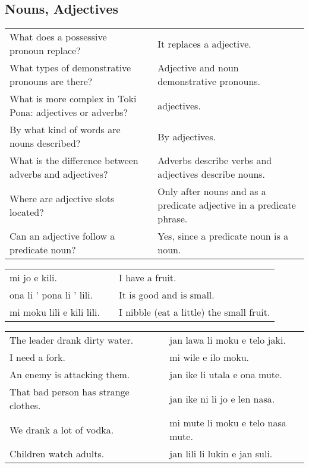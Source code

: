 \newpage
%
\subsection*{Nouns, Adjectives} 
\label{'adjectives'}
%
\begin{supertabular}{p{5,5cm}|ll}
What does a possessive pronoun replace? && It replaces a adjective. \\ %
What types of demonstrative pronouns are there? && Adjective and noun demonstrative pronouns.  \\ %
What is more complex in Toki Pona: adjectives or adverbs? && adjectives.  \\ %
By what kind of words are nouns described? && By adjectives.  \\ %
What is the difference between adverbs and adjectives? && Adverbs describe verbs and adjectives describe nouns. \\ %
Where are adjective slots located? && Only after nouns and as a predicate adjective in a predicate phrase. \\ %
Can an adjective follow a predicate noun? && Yes, since a predicate noun is a noun.  \\ %
\end{supertabular} 

\begin{supertabular}{p{5,5cm}|ll}
mi jo e kili.  &&  I have a fruit. \\
ona li ' pona li ' lili. && It is good and is small. \\
mi moku lili e kili lili.  && I nibble (eat a little) the small fruit. \\
\end{supertabular}  

\begin{supertabular}{p{5,5cm}|ll}
The leader drank dirty water.  && jan lawa li moku e telo jaki. \\ %
I need a fork.  && mi wile e ilo moku. \\ %
An enemy is attacking them. && jan ike li utala e ona mute. \\ %
That bad person has strange clothes.  && jan ike ni li jo e len nasa. \\ %
We drank a lot of vodka.  && mi mute li moku e telo nasa mute. \\ %
Children watch adults.  && jan lili li lukin e jan suli. \\ %
\end{supertabular}  

